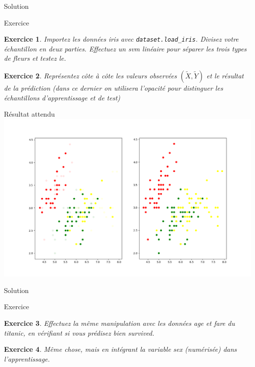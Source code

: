 \documentclass[11pt]{beamer}
\newtheorem{exercice}{Exercice}
\newcommand{\Pythonsmall}[1]{
	{\scriptsize }
}
\begin{document}
\begin{frame}{Solution}
\Pythonsmall{ex500}
\end{frame}

\begin{frame}{Exercice}
\begin{exercice}
Importez les données iris avec \texttt{dataset.load\_iris}. Divisez votre échantillon en deux parties. Effectuez un svm linéaire pour séparer les trois types de fleurs et testez le.
\end{exercice}
\begin{exercice}
Représentez côte à côte les valeurs observées $(\tilde{X},\tilde{Y})$ et le résultat de la prédiction (dans ce dernier on utilisera l'opacité pour distinguer les échantillons d'apprentissage et de test) 
\end{exercice}
\end{frame}

\begin{frame}{Résultat attendu}
\includegraphics[scale=0.35]{ex502}
\end{frame}

\begin{frame}{Solution}
\vspace{-0.3cm}
\Pythonsmall{ex502}
\end{frame}

\begin{frame}{Exercice}
\begin{exercice}
Effectuez la même manipulation avec les données \textit{age} et \textit{fare} du titanic, en vérifiant si vous prédisez bien \textit{survived}.
\end{exercice}

\begin{exercice}
Même chose, mais en intégrant la variable \textit{sex} (numérisée) dans l'apprentissage.
\end{exercice}
\end{frame}
\end{document}

